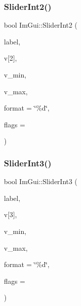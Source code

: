 \mbox{\label{namespaceImGui_a9913948869631d72e4fa5dd69235350e}} 
\subsubsection{\texorpdfstring{Slider\+Int2()}{SliderInt2()}}
{\footnotesize\ttfamily bool Im\+Gui\+::\+Slider\+Int2 (\begin{DoxyParamCaption}\item[{const char $\ast$}]{label,  }\item[{int}]{v\mbox{[}2\mbox{]},  }\item[{int}]{v\+\_\+min,  }\item[{int}]{v\+\_\+max,  }\item[{const char $\ast$}]{format = {\ttfamily \char`\"{}\%d\char`\"{}},  }\item[{Im\+Gui\+Slider\+Flags}]{flags = {} }\end{DoxyParamCaption})}

\mbox{\label{namespaceImGui_ab1e67cf69998479a59677e332dba745b}} 
\subsubsection{\texorpdfstring{Slider\+Int3()}{SliderInt3()}}
{\footnotesize\ttfamily bool Im\+Gui\+::\+Slider\+Int3 (\begin{DoxyParamCaption}\item[{const char $\ast$}]{label,  }\item[{int}]{v\mbox{[}3\mbox{]},  }\item[{int}]{v\+\_\+min,  }\item[{int}]{v\+\_\+max,  }\item[{const char $\ast$}]{format = {\ttfamily \char`\"{}\%d\char`\"{}},  }\item[{Im\+Gui\+Slider\+Flags}]{flags = {} }\end{DoxyParamCaption})}

\mbox{\label{namespaceImGui_a9a0bb4c55424177ab7894e5a87bd91ea}} 
